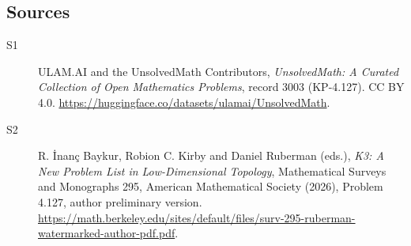 \documentclass[11pt]{article}
\begin{document}
\subsection{Sources}
\begin{description}
\item[\hypertarget{source:3003:1}{S1}] ULAM.AI and the UnsolvedMath Contributors, \emph{UnsolvedMath: A Curated Collection of Open Mathematics Problems}, record 3003 (KP-4.127). CC BY 4.0. \url{https://huggingface.co/datasets/ulamai/UnsolvedMath}.
\item[\hypertarget{source:3003:2}{S2}] R. İnanç Baykur, Robion C. Kirby and Daniel Ruberman (eds.), \emph{K3: A New Problem List in Low-Dimensional Topology}, Mathematical Surveys and Monographs 295, American Mathematical Society (2026), Problem 4.127, author preliminary version. \url{https://math.berkeley.edu/sites/default/files/surv-295-ruberman-watermarked-author-pdf.pdf}.
\end{description}
\label{end:3003}
\end{document}
